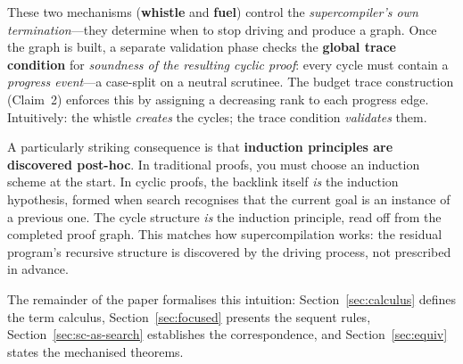 These two mechanisms (\textbf{whistle} and \textbf{fuel}) control the
\emph{supercompiler's own termination}---they determine when to stop
driving and produce a graph.  Once the graph is built, a separate
validation phase checks the \textbf{global trace condition} for
\emph{soundness of the resulting cyclic proof}: every cycle must contain
a \emph{progress event}---a case-split on a neutral scrutinee.
The budget trace construction (Claim~2) enforces this by assigning a
decreasing rank to each progress edge.  Intuitively: the whistle
\emph{creates} the cycles; the trace condition \emph{validates} them.

A particularly striking consequence is that \textbf{induction principles are discovered post-hoc}. In traditional proofs, you must choose an induction scheme at the start. In cyclic proofs, the backlink itself \emph{is} the induction hypothesis, formed when search recognises that the current goal is an instance of a previous one. The cycle structure \emph{is} the induction principle, read off from the completed proof graph. This matches how supercompilation works: the residual program's recursive structure is discovered by the driving process, not prescribed in advance.

The remainder of the paper formalises this intuition: Section~\ref{sec:calculus} defines the term calculus, Section~\ref{sec:focused} presents the sequent rules, Section~\ref{sec:sc-as-search} establishes the correspondence, and Section~\ref{sec:equiv} states the mechanised theorems.
